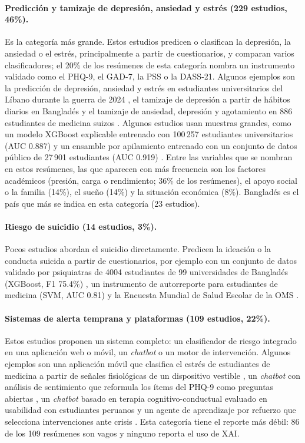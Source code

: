 \documentclass[11pt,a4paper]{article}
\begin{document}
\paragraph{Predicción y tamizaje de depresión, ansiedad y estrés (229 estudios, 46\%).} Es la categoría más grande. Estos estudios predicen o clasifican la depresión, la ansiedad o el estrés, principalmente a partir de cuestionarios, y comparan varios clasificadores; el 20\% de los resúmenes de esta categoría nombra un instrumento validado como el PHQ-9, el GAD-7, la PSS o la DASS-21. Algunos ejemplos son la predicción de depresión, ansiedad y estrés en estudiantes universitarios del Líbano durante la guerra de 2024 \cite{S001}, el tamizaje de depresión a partir de hábitos diarios en Bangladés \cite{S011} y el tamizaje de ansiedad, depresión y agotamiento en 886 estudiantes de medicina suizos \cite{I468}. Algunos estudios usan muestras grandes, como un modelo XGBoost explicable entrenado con 100\,257 estudiantes universitarios (AUC 0.887) \cite{S003} y un ensamble por apilamiento entrenado con un conjunto de datos público de 27\,901 estudiantes (AUC 0.919) \cite{D011}. Entre las variables que se nombran en estos resúmenes, las que aparecen con más frecuencia son los factores académicos (presión, carga o rendimiento; 36\% de los resúmenes), el apoyo social o la familia (14\%), el sueño (14\%) y la situación económica (8\%). Bangladés es el país que más se indica en esta categoría (23 estudios).

\paragraph{Riesgo de suicidio (14 estudios, 3\%).} Pocos estudios abordan el suicidio directamente. Predicen la ideación o la conducta suicida a partir de cuestionarios, por ejemplo con un conjunto de datos validado por psiquiatras de 4004 estudiantes de 99 universidades de Bangladés (XGBoost, F1 75.4\%) \cite{S010}, un instrumento de autorreporte para estudiantes de medicina (SVM, AUC 0.81) \cite{I503} y la Encuesta Mundial de Salud Escolar de la OMS \cite{I820}.

\paragraph{Sistemas de alerta temprana y plataformas (109 estudios, 22\%).} Estos estudios proponen un sistema completo: un clasificador de riesgo integrado en una aplicación web o móvil, un \emph{chatbot} o un motor de intervención. Algunos ejemplos son una aplicación móvil que clasifica el estrés de estudiantes de medicina a partir de señales fisiológicas de un dispositivo vestible \cite{I388}, un \emph{chatbot} con análisis de sentimiento que reformula los ítems del PHQ-9 como preguntas abiertas \cite{I212}, un \emph{chatbot} basado en terapia cognitivo-conductual evaluado en usabilidad con estudiantes peruanos \cite{I476} y un agente de aprendizaje por refuerzo que selecciona intervenciones ante crisis \cite{S004}. Esta categoría tiene el reporte más débil: 86 de los 109 resúmenes son vagos y ninguno reporta el uso de XAI.
\end{document}
